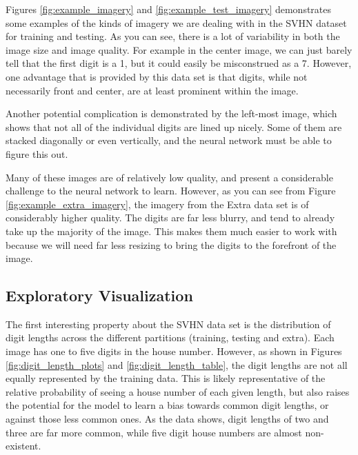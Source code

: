\documentclass[12pt]{article}
\begin{document}
Figures \ref{fig:example_imagery} and \ref{fig:example_test_imagery} demonstrates some examples of the kinds of imagery we are dealing with in the SVHN dataset for training and testing. 
As you can see, there is a lot of variability in both the image size and image quality. 
For example in the center image, we can just barely tell that the first digit is a 1, but it could easily be misconstrued as a 7. 
However, one advantage that is provided by this data set is that digits, while not necessarily front and center, are at least prominent within the image.

Another potential complication is demonstrated by the left-most image, which shows that not all of the individual digits are lined up nicely.
Some of them are stacked diagonally or even vertically, and the neural network must be able to figure this out.

Many of these images are of relatively low quality, and present a considerable challenge to the neural network to learn.
However, as you can see from Figure \ref{fig:example_extra_imagery}, the imagery from the Extra data set is of considerably higher quality.
The digits are far less blurry, and tend to already take up the majority of the image.
This makes them much easier to work with because we will need far less resizing to bring the digits to the forefront of the image.

\subsection{Exploratory Visualization}
The first interesting property about the SVHN data set is the distribution of digit lengths across the different partitions (training, testing and extra).
Each image has one to five digits in the house number.
However, as shown in Figures \ref{fig:digit_length_plots} and \ref{fig:digit_length_table}, the digit lengths are not all equally represented by the training data.
This is likely representative of the relative probability of seeing a house number of each given length, but also raises the potential for the model to learn a bias towards common digit lengths, or against those less common ones.
As the data shows, digit lengths of two and three are far more common, while five digit house numbers are almost non-existent.
\end{document}
